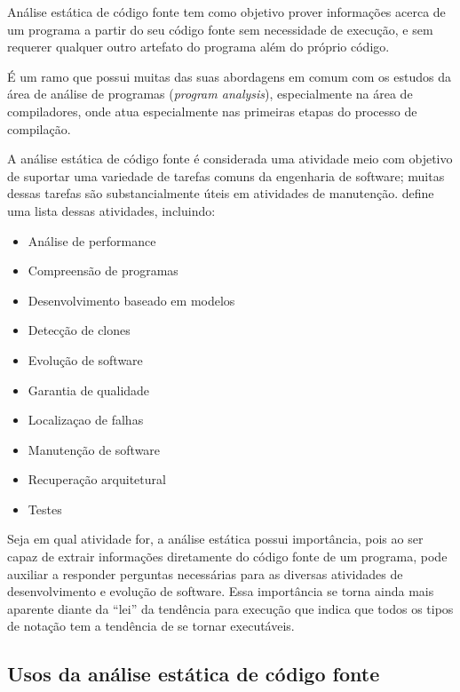 Análise estática de código fonte tem como objetivo prover
informações acerca de um programa a partir do seu código fonte sem
necessidade de execução, e sem requerer qualquer outro artefato do programa
além do próprio código.

É um ramo que possui muitas das suas abordagens em comum com os estudos da
área de análise de programas ({\it program analysis}), especialmente na área de
compiladores, onde atua especialmente nas primeiras etapas do processo de compilação.

A análise estática de código fonte é considerada uma atividade meio com
objetivo de suportar uma variedade de tarefas comuns da engenharia de
software; muitas dessas tarefas são substancialmente úteis em atividades de
manutenção.  define uma lista dessas
atividades, incluindo:

\begin{multicols}{2}
  \begin{itemize}
    \item Análise de performance
    \item Compreensão de programas
    \item Desenvolvimento baseado em modelos
    \item Detecção de clones
    \item Evolução de software
    \item Garantia de qualidade
    \item Localizaçao de falhas
    \item Manutenção de software
    \item Recuperação arquitetural
    \item Testes
  \end{itemize}
\end{multicols}

Seja em qual atividade for, a análise estática possui importância,
pois ao ser capaz de extrair informações diretamente do
código fonte de um programa, pode auxiliar a responder perguntas necessárias
para as diversas atividades de desenvolvimento e evolução de software. Essa
importância se torna ainda mais aparente diante da ``lei'' da tendência para
execução \cite{Harman2010} que indica que todos os tipos de notação tem a
tendência de se tornar executáveis.

\subsection{Usos da análise estática de código fonte} \label{usos}

